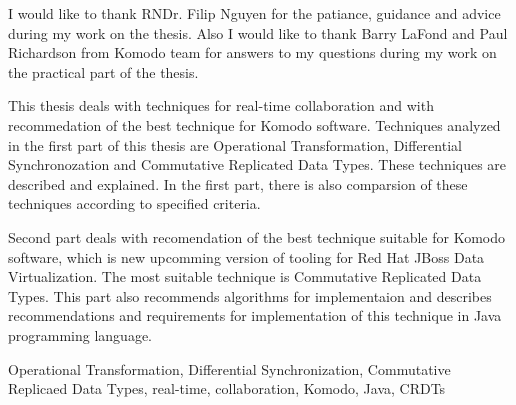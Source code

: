\documentclass[12pt,oneside]{fithesis2}
\begin{document}
\FrontMatter
\ThesisTitlePage
\begin{ThesisDeclaration}
\DeclarationText
\AdvisorName
\end{ThesisDeclaration}
\begin{ThesisThanks}
I would like to thank RNDr. Filip Nguyen for the patiance, guidance and advice during my work on the thesis. Also I would like to thank Barry LaFond and Paul Richardson from Komodo team for answers to my questions during my work on the practical part of the thesis.
\end{ThesisThanks}
\begin{ThesisAbstract}
This thesis deals with techniques for real-time collaboration and with recommedation of the best technique for Komodo software. Techniques analyzed in the first part of this thesis are Operational Transformation, Differential Synchronozation and Commutative Replicated Data Types. These techniques are described and explained. In the first part, there is also comparsion of these techniques according to specified criteria.
\par Second part deals with recomendation of the best technique suitable for Komodo software, which is new upcomming version of tooling for Red Hat JBoss Data Virtualization. The most suitable technique is Commutative Replicated Data Types. This part also recommends algorithms for implementaion and describes recommendations and requirements for implementation of this technique in Java programming language.
\end{ThesisAbstract}
\begin{ThesisKeyWords}
Operational Transformation, Differential Synchronization, Commutative Replicaed Data Types, real-time, collaboration, Komodo, Java, CRDTs
\end{ThesisKeyWords}
\tableofcontents 
\MainMatter
\end{document}
